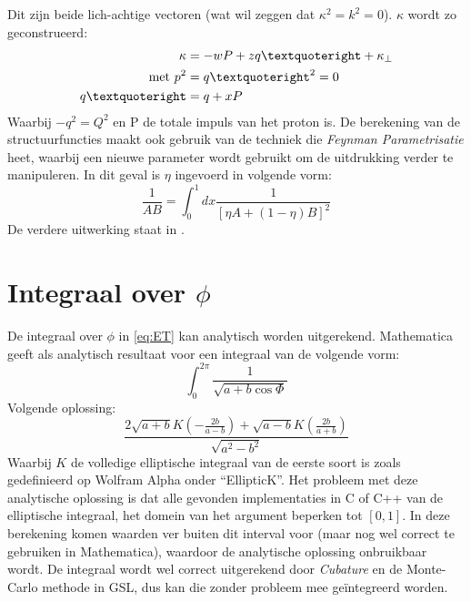 \documentclass[a4paper,11pt]{article}
\numberwithin{equation}{section} %
\begin{document}
Dit zijn beide lich-achtige vectoren (wat wil zeggen dat $\kappa^2 = k^2 = 0$).
$\kappa$ wordt zo geconstrueerd:
\begin{align}
\kappa &= -wP + z q’ + \kappa_\perp \\
\text{met } p^2 &= q’^2 = 0 \notag \\
q’ &= q + xP
\end{align}
Waarbij $-q^2 = Q^2$ en P de totale impuls van het proton is.
De berekening van de structuurfuncties maakt ook gebruik van de techniek die \textit{Feynman Parametrisatie} heet, waarbij een nieuwe parameter wordt gebruikt om de uitdrukking verder te manipuleren.
In dit geval is $\eta$ ingevoerd in volgende vorm:
\begin{equation}
\frac{1}{AB} = \int_0^1 dx \frac{1}{\left[\eta A+(1-\eta)B \right]^2}
\end{equation}
De verdere uitwerking staat in \cite{Barone}.

\section{Integraal over $\phi$} \label{app:PhiIntegral}
De integraal over $\phi$ in \eqref{eq:ET} kan analytisch worden uitgerekend.
Mathematica geeft als analytisch resultaat voor een integraal van de volgende vorm:
\begin{equation}
\int_0^{2\pi} \frac{1}{\sqrt{a + b \cos{\Phi}}}
\end{equation}
Volgende oplossing:
\begin{equation}
\frac{2 \sqrt{a + b} K(-\frac{2b}{a - b}) + \sqrt{a - b} K(\frac{2b}{a + b})}{\sqrt{a^2 - b^2}}
\end{equation}
Waarbij $K$ de volledige elliptische integraal van de eerste soort is zoals gedefinieerd op Wolfram Alpha onder “EllipticK”.
Het probleem met deze analytische oplossing is dat alle gevonden implementaties in C of C++ van de elliptische integraal, het domein van het argument beperken tot $[0,1]$.
In deze berekening komen waarden ver buiten dit interval voor (maar nog wel correct te gebruiken in Mathematica), waardoor de analytische oplossing onbruikbaar wordt.
De integraal wordt wel correct uitgerekend door \textit{Cubature} en de Monte-Carlo methode in GSL, dus kan die zonder probleem mee geïntegreerd worden.
\end{document}
